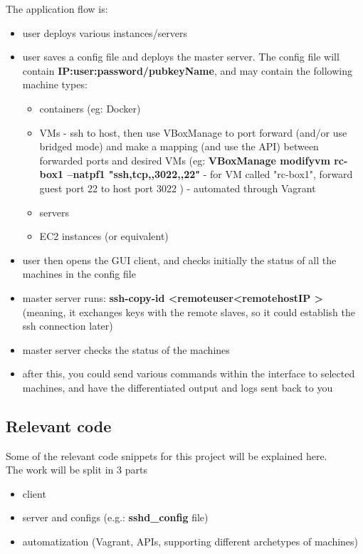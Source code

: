 \documentclass{llncs}
\begin{document}
The application flow is:
\begin{itemize}
  \item user deploys various instances/servers
  \item user saves a config file and deploys the master server. The config file will contain \textbf{IP:user:password/pubkeyName}, and may contain the following machine types:
  \begin{itemize}
  	\item containers (eg: Docker)
    \item VMs - ssh to host, then use VBoxManage to port forward (and/or use bridged mode) and make a mapping (and use the API) between forwarded ports and desired VMs (eg: \textbf{VBoxManage modifyvm rc-box1 --natpf1 "ssh,tcp,,3022,,22"} - for VM called "rc-box1", forward guest port 22 to host port 3022 ) - automated through Vagrant
    \item servers
    \item EC2 instances (or equivalent)
  \end{itemize}
  \item user then opens the GUI client, and checks initially the status of all the machines in the config file
  \item master server runs: \textbf{ssh-copy-id \textless remoteuser\textgreater@\textless remotehostIP \textgreater} (meaning, it exchanges keys with the remote slaves, so it could establish the ssh connection later)
  \item master server checks the status of the machines
  \item after this, you could send various commands within the interface to selected machines, and have the differentiated output and logs sent back to you
\end{itemize}

\subsection{Relevant code}

Some of the relevant code snippets for this project will be explained here.\\

The work will be split in 3 parts
\begin{itemize}
	\item client
    \item server and configs (e.g.: \textbf{sshd\_config} file)
    \item automatization (Vagrant, APIs, supporting different archetypes of machines)
\end{itemize}
\end{document}
